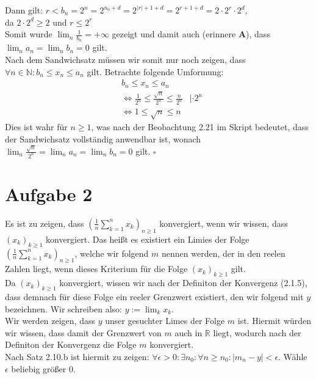 \documentclass[12pt, a4paper]{article}
\newcommand*{\qed}{\null\nobreak\hfill\ensuremath{\square}}
\begin{document}
Dann gilt: $r < b_n = 2^{n} = 2^{n_0 + d} = 2^{|r| + 1 + d} = 2^{r + 1 + d} = 2 \cdot 2^r \cdot 2^d$, \\
da $2 \cdot 2^d \ge 2$ und $r \le 2^r$ \\
Somit wurde $\lim_{n}\frac{1}{b_n} = +\infty$ gezeigt und damit auch (erinnere \textbf{A}), dass $\lim_{n}a_n = \lim_{n}b_n = 0$ gilt.\\
Nach dem Sandwichsatz müssen wir somit nur noch zeigen, dass \\
$\forall n \in \mathbb N: b_n \le x_n \le a_n$ gilt. Betrachte folgende Umformung:
\vspace{-0.5cm}
\begin{align*}
    & b_n \le x_n \le a_n & \\
    & \Longleftrightarrow \frac{1}{2^n} \le \frac{\sqrt{n}}{2^n} \le \frac{n}{2^n} &| \cdot 2^n \\
    & \Longleftrightarrow 1 \le \sqrt{n} \le n &
\end{align*}
Dies ist wahr für $n \ge 1$, was nach der Beobachtung 2.21 im Skript bedeutet, dass der Sandwichsatz vollständig anwendbar ist, wonach \\
$\lim_{n}\frac{\sqrt{n}}{2^n} = \lim_{n}a_n = \lim_{n}b_n = 0$ gilt. \qed \\



\section*{Aufgabe 2}
Es ist zu zeigen, dass $\left(\frac{1}{n}\sum_{k = 1}^{n}x_k\right)_{n \ge 1}$ konvergiert, wenn wir wissen, dass $(x_k)_{k \ge 1}$ konvergiert. Das heißt es existiert ein Limies der Folge $\left(\frac{1}{n}\sum_{k = 1}^{n}x_k\right)_{n \ge 1}$,
welche wir folgend $m$ nennen werden, der in den reelen Zahlen liegt, wenn dieses Kriterium für die Folge $(x_k)_{k \ge 1}$ gilt. \\
Da $(x_k)_{k \ge 1}$ konvergiert, wissen wir nach der Definiton der Konvergenz (2.1.5), dass demnach für diese Folge ein reeler Grenzwert existiert, den wir folgend mit $y$ bezeichnen. Wir schreiben also: $y := \lim_{k}x_k$. \\
Wir werden zeigen, dass $y$ unser gesuchter Limes der Folge $m$ ist. Hiermit würden wir wissen, dass damit der Grenzwert von $m$ auch in $\mathbb R$ liegt, wodurch nach der Definiton der Konvergenz die Folge $m$ konvergiert. \\
Nach Satz 2.10.b ist hiermit zu zeigen: $\forall \epsilon > 0: \exists n_0: \forall n \ge n_0: |m_n - y| < \epsilon$.
Wähle $\epsilon$ beliebig größer $0$. \\

\end{document}

